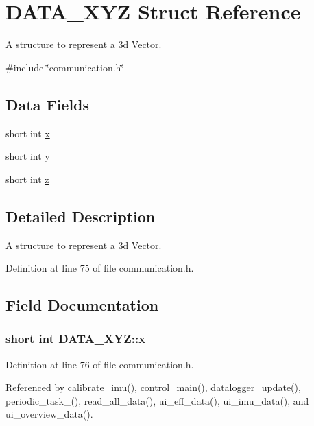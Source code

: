 \hypertarget{structDATA__XYZ}{
\section{DATA\_\-XYZ Struct Reference}
\label{structDATA__XYZ}
}


A structure to represent a 3d Vector.  




{\ttfamily \#include \char`\"{}communication.h\char`\"{}}

\subsection*{Data Fields}
\begin{DoxyCompactItemize}
\item 
short int \hyperlink{structDATA__XYZ_a54c1596e9f9969fd9c21e8458024ecfb}{x}
\item 
short int \hyperlink{structDATA__XYZ_a94bbb1c889bf53eb6a5fffa2b39322cf}{y}
\item 
short int \hyperlink{structDATA__XYZ_a69e89ab0ec6e5d72fc5d54f62cc07fb5}{z}
\end{DoxyCompactItemize}


\subsection{Detailed Description}
A structure to represent a 3d Vector. 

Definition at line 75 of file communication.h.



\subsection{Field Documentation}
\hypertarget{structDATA__XYZ_a54c1596e9f9969fd9c21e8458024ecfb}{
\subsubsection[{x}]{\setlength{\rightskip}{0pt plus 5cm}short int {\bf DATA\_\-XYZ::x}}}
\label{structDATA__XYZ_a54c1596e9f9969fd9c21e8458024ecfb}


Definition at line 76 of file communication.h.



Referenced by calibrate\_\-imu(), control\_\-main(), datalogger\_\-update(), periodic\_\-task\_(), read\_\-all\_\-data(), ui\_\-eff\_\-data(), ui\_\-imu\_\-data(), and ui\_\-overview\_\-data().

